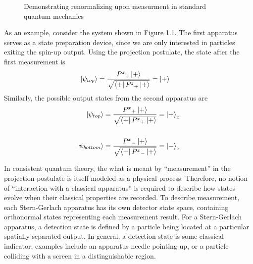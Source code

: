 \begin{figure}
\centering\CaptionFontSize
{}
\caption[Insert an abbreviated caption here to show in the List of Figures]
{Demonstrating renormalizing upon measurment in standard quantum mechanics}
\label{Figure:Measurement:Renormalizing}
\end{figure}

As an example, consider the system shown in Figure 1.1. The first apparatus serves as a state preparation device, since we are only interested in particles exiting the spin-up output. Using the projection postulate, the state after the first measurement is
\begin{align*}
    \ket{\psi_{top}} &= \frac{{P^z}_+\ket{+}}{\sqrt{\bra{+}{P^z}_+\ket{+}}} = \ket{+}
\end{align*}
Similarly, the possible output states from the second apparatus are
\begin{align*}
    \ket{\psi_{top}} &= \frac{{P^x}_+\ket{+}}{\sqrt{\bra{+}{P^x}_+\ket{+}}} = \ket{+}_x \\ \\
    \ket{\psi_{bottom}} &= \frac{{P^x}_-\ket{+}}{\sqrt{\bra{+}{P^x}_-\ket{+}}} = \ket{-}_x
\end{align*}

In consistent quantum theory, the what is meant by ``measurement'' in the projection postulate is itself modeled as a physical process. Therefore, no notion of ``interaction with a classical apparatus'' is required to describe how states evolve when their classical properties are recorded. To describe measurement, each Stern-Gerlach apparatus has its own detector state space, containing orthonormal states representing each measurement result. For a Stern-Gerlach apparatus, a detection state is defined by a particle being located at a particular spatially separated output. In general, a detection state is some classical indicator; examples include an apparatus needle pointing up, or a particle colliding with a screen in a distinguishable region.

